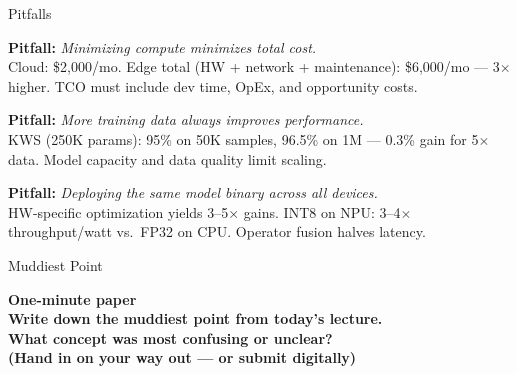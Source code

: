 \documentclass[aspectratio=169, 12pt]{beamer}
\begin{document}
\begin{frame}{Pitfalls}
\note{
%
%
%
}

\footnotesize
\textbf{Pitfall:} \textit{Minimizing compute minimizes total cost.}\\
Cloud: \$2,000/mo. Edge total (HW + network + maintenance): \$6,000/mo --- 3$\times$ higher. TCO must include dev time, OpEx, and opportunity costs.

\vspace{0.1cm}
\textbf{Pitfall:} \textit{More training data always improves performance.}\\
KWS (250K params): 95\% on 50K samples, 96.5\% on 1M --- 0.3\% gain for 5$\times$ data. Model capacity and data quality limit scaling.

\vspace{0.1cm}
\textbf{Pitfall:} \textit{Deploying the same model binary across all devices.}\\
HW-specific optimization yields 3--5$\times$ gains. INT8 on NPU: 3--4$\times$ throughput/watt vs.\ FP32 on CPU. Operator fusion halves latency.

\end{frame}


\begin{frame}{Muddiest Point}
\note{
%
}

\centering
\Large\bfseries One-minute paper\\[0.5cm]
\normalsize Write down the \textbf{muddiest point} from today's lecture.\\[0.2cm]
{\small What concept was most confusing or unclear?}\\[0.5cm]
{\footnotesize\textcolor{midgray}{(Hand in on your way out --- or submit digitally)}}
\end{frame}
\end{document}
